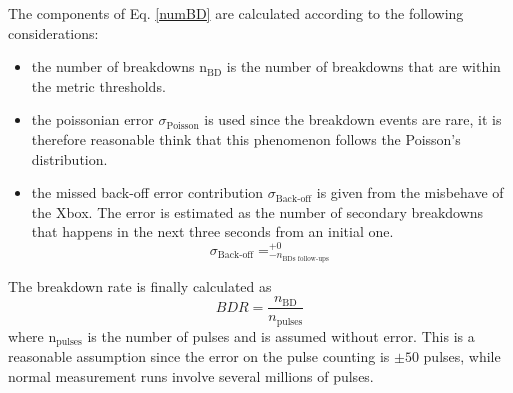 The components of Eq. \ref{numBD} are calculated according to the following considerations:
\begin{itemize}
\item the number of breakdowns n$_{\text{BD}}$ is the number of breakdowns that are within the metric thresholds.  
\item the poissonian error $\sigma_{\text{Poisson}}$ is used since the breakdown events are rare, it is therefore reasonable think that this phenomenon follows the Poisson's distribution.
\item the missed back-off error contribution $ \sigma_{\text{Back-off}}$ is given from the misbehave of the Xbox. The error is estimated as the number of secondary breakdowns that happens in the next three seconds from an initial one. 
\begin{equation}
\sigma_{\text{Back-off}} = _{- n_{\text{BDs follow-ups}}}^{+ 0}
\end{equation}
\end{itemize}

\noindent
The breakdown rate is finally calculated as
\begin{equation}
BDR = \frac{n_{\text{BD}}}{n_{\text{pulses}}}
\end{equation}
where n$_{\text{pulses}}$ is the number of pulses and is assumed without error. This is a reasonable assumption since the error on the pulse counting is $\pm50$ pulses, while normal measurement runs involve several millions of pulses.